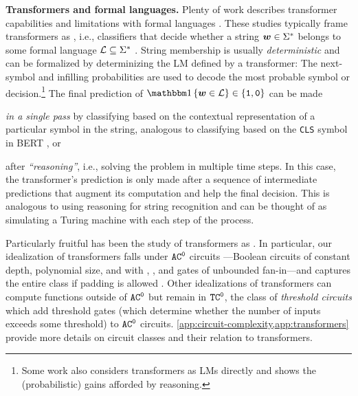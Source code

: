 \documentclass{article} %
\begin{document}
\textbf{Transformers and formal languages.}
Plenty of work describes transformer capabilities and limitations with formal languages \citep{strobl-etal-2024-formal}.
These studies typically frame transformers as , i.e., classifiers that decide whether a string ${{\boldsymbol{w}}} \in {{{{\Sigma}}^{*}}}$ belongs to some formal language ${\mathcal{L}} \subseteq {{{{\Sigma}}^{*}}}$ \citep{butoi2025training}.
String membership is usually \emph{deterministic} and can be formalized by determinizing the LM defined by a transformer: The next-symbol and infilling probabilities are used to decode the most probable symbol or decision.\footnote{Some work also considers transformers as LMs directly \citep{svete-cotterell-2024-transformers,nowak-etal-2024-representational,borenstein-etal-2024-languages,svete-etal-2024-transformers} and shows the (probabilistic) gains afforded by \CoTAcr reasoning.}
The final prediction of $\ind{\str \in \lang} \in \{\acceptSym, \rejectSym\}$ can be made 
\begin{enumerate*}[label=(\arabic*)]
    \item \emph{in a single pass} by classifying based on the contextual representation of a particular symbol in the string, analogous to classifying based on the \texttt{CLS} symbol in BERT \citep{devlin-etal-2019-bert}, or
    \item after \emph{``reasoning''}, i.e., solving the problem in multiple time steps. 
    In this case, the transformer's prediction is only made after a sequence of intermediate predictions that augment its computation and help the final decision.
    This is analogous to using \CoTAcr reasoning for string recognition and can be thought of as simulating a Turing machine with each step of the \CoTAcr process.
\end{enumerate*} 

Particularly fruitful has been the study of transformers as .
In particular, our idealization of transformers falls under ${{{{{{\mathtt{AC}}}^{\mathtt{0}}}}}}$ circuits \citep{li2024chain}---Boolean circuits of constant depth, polynomial size, and with \andGate, \orGate, and \notGate gates of unbounded fan-in---and captures the entire class if padding is allowed \citep{london2025pausetokensstrictlyincrease}.
Other idealizations of transformers can compute functions outside of ${{{{{{\mathtt{AC}}}^{\mathtt{0}}}}}}$ \citep{li2024chain,merrill2025exactexpressivepowertransformers} but remain in ${{{{{{\mathtt{TC}}}^{\mathtt{0}}}}}}$, the class of \emph{threshold circuits} which add threshold gates (which determine whether the number of inputs exceeds some threshold) to ${{{{{{\mathtt{AC}}}^{\mathtt{0}}}}}}$ circuits.
\cref{app:circuit-complexity,app:transformers} provide more details on circuit classes and their relation to transformers.
\end{document}
